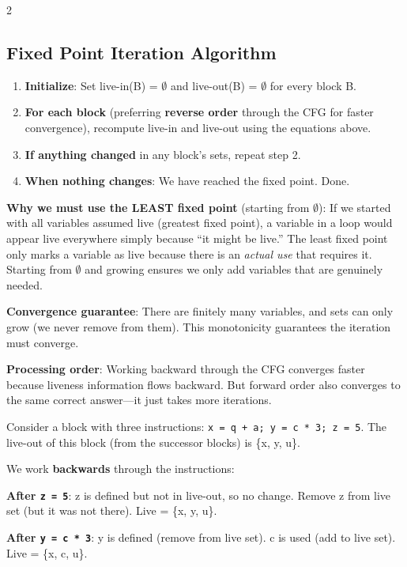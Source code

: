 \documentclass[9pt,landscape]{extarticle}
\begin{document}
\begin{multicols}{2}
\subsection{Fixed Point Iteration Algorithm}

\begin{enumerate}
  \item \textbf{Initialize}: Set live-in(B) = $\emptyset$ and live-out(B) = $\emptyset$ for every block B.
  \item \textbf{For each block} (preferring \textbf{reverse order} through the CFG for faster convergence), recompute live-in and live-out using the equations above.
  \item \textbf{If anything changed} in any block's sets, repeat step 2.
  \item \textbf{When nothing changes}: We have reached the fixed point. Done.
\end{enumerate}

\textbf{Why we must use the LEAST fixed point} (starting from $\emptyset$): If we started with all variables assumed live (greatest fixed point), a variable in a loop would appear live everywhere simply because ``it might be live.'' The least fixed point only marks a variable as live because there is an \emph{actual use} that requires it. Starting from $\emptyset$ and growing ensures we only add variables that are genuinely needed.

\textbf{Convergence guarantee}: There are finitely many variables, and sets can only grow (we never remove from them). This monotonicity guarantees the iteration must converge.

\textbf{Processing order}: Working backward through the CFG converges faster because liveness information flows backward. But forward order also converges to the same correct answer---it just takes more iterations.

\begin{exambox}
Consider a block with three instructions: \texttt{x = q + a; y = c * 3; z = 5}. The live-out of this block (from the successor blocks) is \{x, y, u\}.

We work \textbf{backwards} through the instructions:

\textbf{After \texttt{z = 5}}: z is defined but not in live-out, so no change. Remove z from live set (but it was not there). Live = \{x, y, u\}.

\textbf{After \texttt{y = c * 3}}: y is defined (remove from live set). c is used (add to live set). Live = \{x, c, u\}.


\end{exambox}
\end{multicols}
\end{document}
